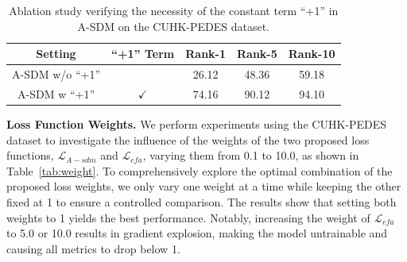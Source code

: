 \documentclass[acmsmall]{acmart}
\begin{document}
\begin{table}[t] \footnotesize
    \centering
    \caption{The sensitivity analysis of the weight of $\mathcal{L}_{A-sdm}$ and $\mathcal{L}_{efa}$ on the CUHK-PEDES dataset, where one weight is varied and the other is fixed at 1.0.}
    \label{tab:weight}
\end{table}

\begin{table}[t] \footnotesize
    \centering
    \caption{Ablation study verifying the necessity of the constant term ``+1'' in A-SDM on the CUHK-PEDES dataset.}
    \label{tab:add_1}
    \begin{tabular}{c|c|ccc}
    \hline
    Setting & ``+1'' Term & Rank-1 & Rank-5 & Rank-10 \\
    \hline
    A-SDM w/o ``+1'' &  &  26.12 & 48.36 & 59.18 \\
    A-SDM w ``+1'' & $\checkmark$ & 74.16 & 90.12 & 94.10 \\
    \hline
    \end{tabular}
\end{table}

{\bfseries Loss Function Weights.} We perform experiments using the
CUHK-PEDES dataset to investigate the influence of the weights of
the two proposed loss functions, $\mathcal{L}_{A-sdm}$ and
$\mathcal{L}_{efa}$, varying them from 0.1 to 10.0, as shown in
Table~\ref{tab:weight}. To comprehensively explore the optimal
combination of the proposed loss weights, we only vary one weight at
a time while keeping the other fixed at 1 to ensure a controlled
comparison. The results show that setting both weights to 1 yields
the best performance. Notably, increasing the weight of
$\mathcal{L}_{efa}$ to 5.0 or 10.0 results in gradient explosion,
making the model untrainable and causing all metrics to drop below
1.
\end{document}
